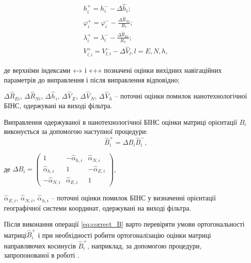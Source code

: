 \begin{equation} \label{eq:correct_lam_phi_V} 
\begin{array}{l} 
{h^{+}_{i} =h^{-}_{i} -\Delta \hat{h}_{i} ;} \\ 
{\varphi_{i}^{+} =\varphi ^{-}_{i} -\frac{\Delta \hat{R}_{Ni} }{R_{7} } ;} \\ 
{\lambda_{i}^{+} =\lambda ^{-}_{i} -\frac{\Delta \hat{R}_{Ei} }{R_{7} } ;} \\ 
{V^{+}_{l,i}=V^{-}_{l,i} -\Delta \hat{V}_{l} , l=E,N,h,} \end{array} 
\end{equation} 
\begin{ESKDexplanation}
\item де верхніми індексами  «-» і «+» позначені оцінки вихідних навігаційних параметрів 
до виправлення і після виправлення відповідно;
\item $\Delta \stackrel{\frown}{R}_{Ei} $, $\Delta \stackrel{\frown}{R}_{Ni} $, $\Delta 
\stackrel{\frown}{h}_{i} $, $\Delta \stackrel{\frown}{V}_{E} $, $\Delta \stackrel{
\frown}{V}_{N} $, $\Delta \stackrel{\frown}{V}_{h} $ -- поточні оцінки помилок нанотехнологічної 
БІНС, одержувані на виході фільтра.
\end{ESKDexplanation}
Виправлення одержуваної в нанотехнологічної БІНС оцінки матриці орієнтації $B_{i} $ виконується 
за допомогою наступної процедури:
\begin{equation}
\label{eq:correct_B}
\stackrel{\frown}{B}^{+}_{i} =\Delta B_{i} \stackrel{\frown}{B}^{-}_{i},
\end{equation}
\begin{ESKDexplanation}
\item де
$\Delta B_{i} =\left(\begin{array}{ccc} 
{1} & {-\hat{\alpha }_{h,i} } & {\hat{\alpha }_{N,i} }\\ 
{\hat{\alpha }_{h,i} } & {1} & {-\hat{\alpha }_{E,i} }\\ 
{-\hat{\alpha }_{N,i} } & {\hat{\alpha }_{E,i} } & {1} \end{array}\right)$,                                              
\item $\stackrel{\frown}{\alpha }_{E,i} $, $\stackrel{\frown}{\alpha }_{N,i} $, 
$\stackrel{\frown}{\alpha }_{h,i} $ -- поточні оцінки помилок  БІНС   у визначенні 
орієнтації географічної системи координат, одержувані на виході фільтра.
\end{ESKDexplanation}

Після виконання операції \eqref{eq:correct_B} варто перевіряти умови ортогональності 
матриці$\stackrel{\frown}{B}^{+}_{i} $ і при необхідності робити ортогоналізацію 
оцінки матриці направляючих косинусів $\stackrel{\frown}{B}^{+}_{i} $, наприклад, 
за допомогою процедури, запропонованої в роботі \cite{bib:7}.

